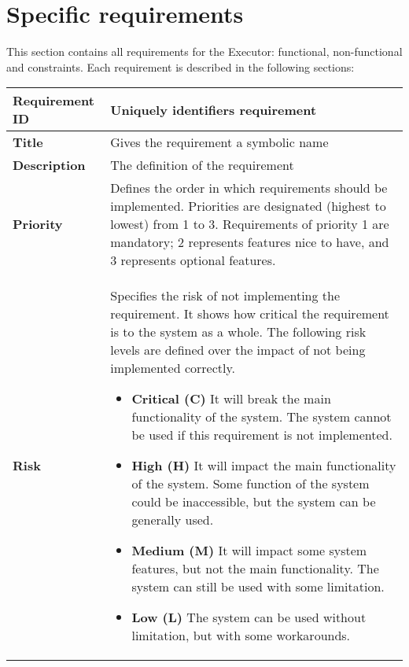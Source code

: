\section{Specific requirements}
This section contains all requirements for the Executor: functional, non-functional and constraints. Each requirement is described in the following sections:
\begin{table}[ht]
  \begin{tabular}{|p{3.5cm}|p{8cm}|}
  \hline
    \textbf{Requirement ID}  & \begin{sloppypar}Uniquely identifiers requirement \end{sloppypar}\\
  \hline
    \textbf{Title}  & \begin{sloppypar}Gives the requirement a symbolic name\end{sloppypar}\\
  \hline
    \textbf{Description}  & \begin{sloppypar}The definition of the requirement\end{sloppypar}\\
  \hline
    \textbf{Priority}  & \begin{sloppypar}Defines the order in which requirements should be implemented. Priorities are designated (highest to lowest) from 1 to 3. Requirements of priority 1 are mandatory; 2 represents features nice to have, and 3 represents optional features.
    \end{sloppypar}\\
  \hline
    \textbf{Risk}  & \begin{sloppypar}
Specifies the risk of not implementing the requirement. It shows how critical the requirement is to the system as a whole. The following risk levels are defined over the impact of not being implemented correctly.
    \begin{itemize}
        \item \textbf{Critical (C)} It will break the main functionality of the system. The system cannot be used if this requirement is not implemented.
        \item \textbf{High (H)} It will impact the main functionality of the system. Some function of the system could be inaccessible, but the system can be generally used.
        \item \textbf{Medium (M)} It will impact some system features, but not the main functionality. The system can still be used with some limitation.
        \item \textbf{Low (L)} The system can be used without limitation, but with some workarounds.
    \end{itemize} \end{sloppypar}\\
  \hline
  \end{tabular}
\end{table}
\clearpage
